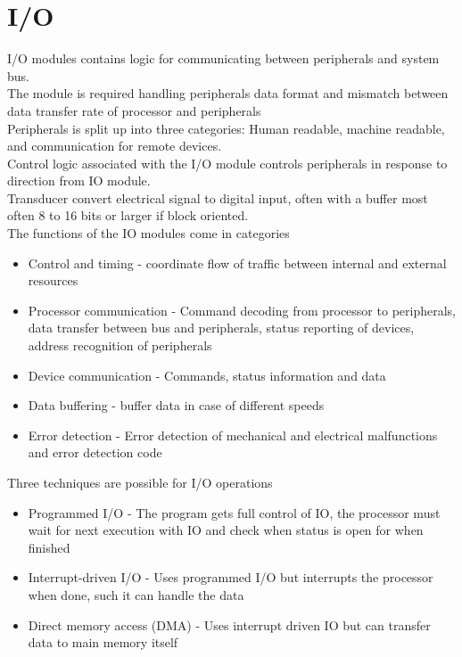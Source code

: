 \documentclass[12pt, a4paper]{article}
\begin{document}
	\section{I/O}
		I/O modules contains logic for communicating between peripherals and system bus.\\
		The module is required handling peripherals data format and mismatch between data transfer rate of processor and peripherals\\
		Peripherals is split up into three categories: Human readable, machine readable, and communication for remote devices.\\
		Control logic associated with the I/O module controls peripherals in response to direction from IO module.\\
		Transducer convert electrical signal to digital input, often with a buffer most often 8 to 16 bits or larger if block oriented.\\
		The functions of the IO modules come in categories
		\begin{itemize}
			\item Control and timing - coordinate flow of traffic between internal and external resources
			\item Processor communication - Command decoding from processor to peripherals, data transfer between bus and peripherals, status reporting of devices, address recognition of peripherals
			\item Device communication - Commands, status information and data
			\item Data buffering - buffer data in case of different speeds
			\item Error detection - Error detection of mechanical and electrical malfunctions and error detection code
		\end{itemize}
		Three techniques are possible for I/O operations
		\begin{itemize}
			\item Programmed I/O - The program gets full control of IO, the processor must wait for next execution with IO and check when status is open for when finished
			\item Interrupt-driven I/O - Uses programmed I/O but interrupts the processor when done, such it can handle the data
			\item Direct memory access (DMA) - Uses interrupt driven IO but can transfer data to main memory itself
		\end{itemize}
\end{document}
